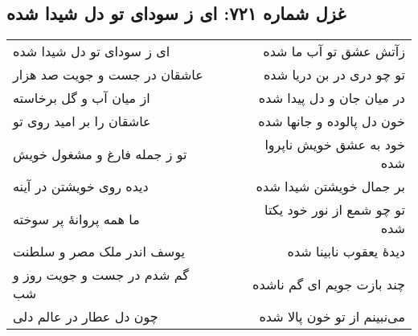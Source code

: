 \begin{center}
\section*{غزل شماره ۷۲۱: ای ز سودای تو دل شیدا شده}
\label{sec:721}
\begin{longtable}{l p{0.5cm} r}
ای ز سودای تو دل شیدا شده
&&
زآتش عشق تو آب ما شده
\\
عاشقان در جست و جویت صد هزار
&&
تو چو دری در بن دریا شده
\\
از میان آب و گل برخاسته
&&
در میان جان و دل پیدا شده
\\
عاشقان را بر امید روی تو
&&
خون دل پالوده و جانها شده
\\
تو ز جمله فارغ و مشغول خویش
&&
خود به عشق خویش ناپروا شده
\\
دیده روی خویشتن در آینه
&&
بر جمال خویشتن شیدا شده
\\
ما همه پروانهٔ پر سوخته
&&
تو چو شمع از نور خود یکتا شده
\\
یوسف اندر ملک مصر و سلطنت
&&
دیدهٔ یعقوب نابینا شده
\\
گم شدم در جست و جویت روز و شب
&&
چند بازت جویم ای گم ناشده
\\
چون دل عطار در عالم دلی
&&
می‌نبینم از تو خون پالا شده
\\
\end{longtable}
\end{center}
